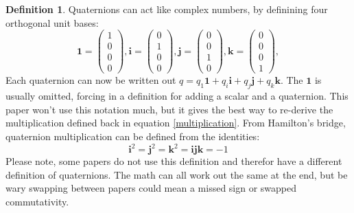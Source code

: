 \documentclass{amsart}
\theoremstyle{definition}
\newtheorem{definition}[theorem]{Definition}
\theoremstyle{remark}
\numberwithin{equation}{section}
\begin{document}
\begin{definition}
  Quaternions can act like complex numbers, by definining four orthogonal unit bases:
  \begin{equation}
    \mathbf{1} =
    \begin{pmatrix}
      1 \\
      0 \\
      0 \\
      0
    \end{pmatrix},
    \mathbf{i} =
    \begin{pmatrix}
      0 \\
      1 \\
      0 \\
      0
    \end{pmatrix}, 
    \mathbf{j} =
    \begin{pmatrix}
      0 \\
      0 \\
      1 \\
      0
    \end{pmatrix}, 
    \mathbf{k} =
    \begin{pmatrix}
      0 \\
      0 \\
      0 \\
      1
    \end{pmatrix},  
  \end{equation}
  Each quaternion can now be written out $q = q_1 \mathbf{1} + q_i \mathbf{i} + q_j \mathbf{j} + q_k \mathbf{k}$. The $\mathbf{1}$ is usually omitted, forcing in a definition for adding a scalar and a quaternion. This paper won't use this notation much, but it gives the best way to re-derive the multiplication defined back in equation \ref{multiplication}. From Hamilton's bridge, quaternion multiplication can be defined from the identities:
  \begin{equation}
    \mathbf{i}^2 = \mathbf{j}^2 = \mathbf{k}^2 = \mathbf{ijk} = -1
  \end{equation}
  Please note, some papers do not use this definition and therefor have a different definition of quaternions. The math can all work out the same at the end, but be wary swapping between papers could mean a missed sign or swapped commutativity.
\end{definition}




\end{document}
